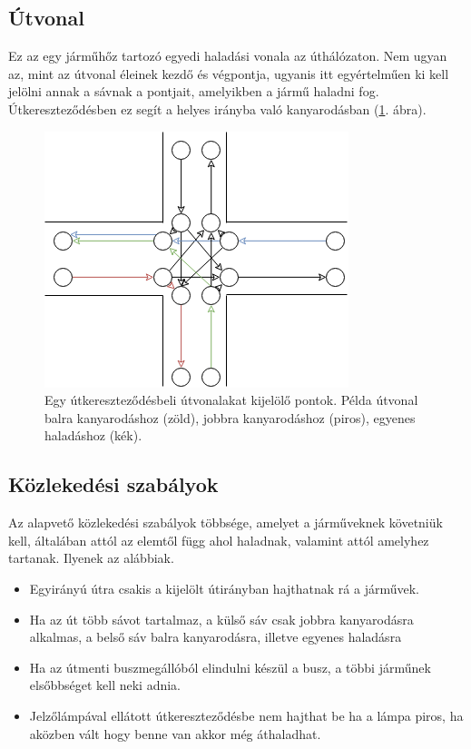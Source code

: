 \subsection{Útvonal}

Ez az egy járműhőz tartozó egyedi haladási vonala az úthálózaton. Nem ugyan az, mint az útvonal éleinek kezdő és végpontja, ugyanis itt egyértelműen ki kell jelölni annak a sávnak a pontjait, amelyikben a jármű haladni fog. Útkereszteződésben ez segít a helyes irányba való kanyarodásban (\ref{fig:path}. ábra).

\begin{figure}[H]
\includegraphics[width=\linewidth]{ut.png}
\caption{Egy útkereszteződésbeli útvonalakat kijelölő pontok. Példa útvonal balra kanyarodáshoz (zöld), jobbra kanyarodáshoz (piros), egyenes haladáshoz (kék).}
\label{fig:path}
\end{figure}

\subsection{Közlekedési szabályok}

Az alapvető közlekedési szabályok többsége, amelyet a járműveknek követniük kell, általában attól az elemtől függ ahol haladnak, valamint attól amelyhez tartanak. Ilyenek az alábbiak.
\begin{itemize}
\item Egyirányú útra csakis a kijelölt útirányban hajthatnak rá a járművek.
\item Ha az út több sávot tartalmaz, a külső sáv csak jobbra kanyarodásra alkalmas, a belső sáv balra kanyarodásra, illetve egyenes haladásra
\item Ha az útmenti buszmegállóból elindulni készül a busz, a többi járműnek elsőbbséget kell neki adnia.
\item Jelzőlámpával ellátott útkereszteződésbe nem hajthat be ha a lámpa piros, ha aközben vált hogy benne van akkor még áthaladhat.
\end{itemize}

